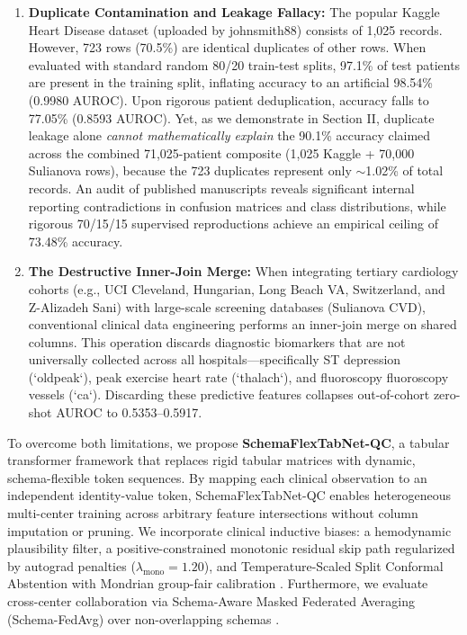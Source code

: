 \documentclass[journal]{IEEEtran}
\begin{document}
\begin{enumerate}
    \item \textbf{Duplicate Contamination and Leakage Fallacy:} The popular Kaggle Heart Disease dataset (uploaded by johnsmith88) consists of 1,025 records. However, 723 rows (70.5\%) are identical duplicates of other rows. When evaluated with standard random 80/20 train-test splits, 97.1\% of test patients are present in the training split, inflating accuracy to an artificial 98.54\% (0.9980 AUROC). Upon rigorous patient deduplication, accuracy falls to 77.05\% (0.8593 AUROC). Yet, as we demonstrate in Section II, duplicate leakage alone \textit{cannot mathematically explain} the 90.1\% accuracy claimed across the combined 71,025-patient composite (1,025 Kaggle + 70,000 Sulianova rows), because the 723 duplicates represent only $\sim$1.02\% of total records. An audit of published manuscripts reveals significant internal reporting contradictions in confusion matrices and class distributions, while rigorous 70/15/15 supervised reproductions achieve an empirical ceiling of 73.48\% accuracy.
    \item \textbf{The Destructive Inner-Join Merge:} When integrating tertiary cardiology cohorts (e.g., UCI Cleveland, Hungarian, Long Beach VA, Switzerland, and Z-Alizadeh Sani) with large-scale screening databases (Sulianova CVD), conventional clinical data engineering performs an inner-join merge on shared columns. This operation discards diagnostic biomarkers that are not universally collected across all hospitals---specifically ST depression (`oldpeak`), peak exercise heart rate (`thalach`), and fluoroscopy fluoroscopy vessels (`ca`). Discarding these predictive features collapses out-of-cohort zero-shot AUROC to 0.5353--0.5917.
\end{enumerate}

To overcome both limitations, we propose \textbf{SchemaFlexTabNet-QC}, a tabular transformer framework that replaces rigid tabular matrices with dynamic, schema-flexible token sequences. By mapping each clinical observation to an independent identity-value token, SchemaFlexTabNet-QC enables heterogeneous multi-center training across arbitrary feature intersections without column imputation or pruning. We incorporate clinical inductive biases: a hemodynamic plausibility filter, a positive-constrained monotonic residual skip path regularized by autograd penalties ($\lambda_{\text{mono}} = 1.20$), and Temperature-Scaled Split Conformal Abstention with Mondrian group-fair calibration \cite{gupta2021}. Furthermore, we evaluate cross-center collaboration via Schema-Aware Masked Federated Averaging (Schema-FedAvg) over non-overlapping schemas \cite{mcmahan2017}.
\end{document}
